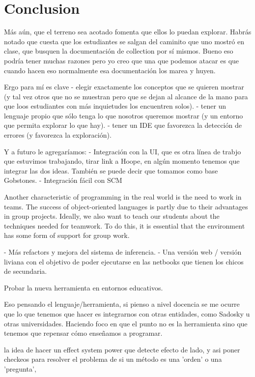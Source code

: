 \section{Conclusion}
\label{sec:conclusion}


Más aún, que el terreno sea acotado fomenta que ellos lo puedan explorar. 
Habrás notado que cuesta que los estudiantes se salgan del caminito que uno mostró en clase, que busquen la documentación de collection por sí mismos. Bueno eso podría tener muchas razones pero yo creo que una que podemos atacar es que cuando hacen eso normalmente esa documentación los marea y huyen.

Ergo para mí es clave 
- elegir exactamente los conceptos que se quieren mostrar (y tal vez otros que no se muestran pero que se dejan al alcance de la mano para que loos estudiantes con más inquietudes los encuentren solos).
- tener un lenguaje propio que sólo tenga lo que nosotros queremos mostrar (y un entorno que permita explorar lo que hay).
- tener un IDE que favorezca la detección de errores (y favorezca la exploración).


\label{sec:furtherWork}
Y a futuro le agregaríamos:
- Integración con la UI, que es otra línea de trabjo que estuvimos trabajando, tirar link a Hoope, en algún momento tenemos que integrar las dos ideas. También se puede decir que tomamos como base Gobstones.
- Integración fácil con SCM

Another characteristic of programming in the real world is the need to work in
teams. The success of object-oriented languages is partly due to their advantages in
group projects. Ideally, we also want to teach our students about the techniques
needed for teamwork. To do this, it is essential that the environment has some form
of support for group work. \cite{kolling_problem_1999}

- Más refactors y mejora del sistema de inferencia.
- Una versión web / versión liviana con el objetivo de poder ejecutarse en las netbooks que tienen los chicos de secundaria.

Probar la nueva herramienta en entornos educativos.

Eso pensando el lenguaje/herramienta, si pienso a nivel docencia se me ocurre que lo que tenemos que hacer es integrarnos con otras entidades, como Sadosky u otras universidades.
Haciendo foco en que el punto no es la herramienta sino que tenemos que repensar cómo enseñamos a programar.

la idea de hacer un effect system
power que detecte efecto de lado, y asi poner checkeos para resolver el problema de si un método es una 'orden' o una 'pregunta', 

